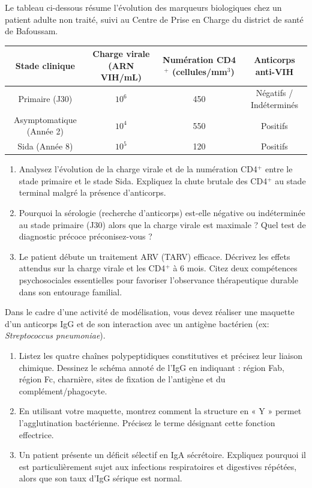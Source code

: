 \documentclass[11pt]{article}
\begin{document}
\begin{exercice}
Le tableau ci-dessous résume l'évolution des marqueurs biologiques chez un patient adulte non traité, suivi au Centre de Prise en Charge du district de santé de Bafoussam.

\begin{center}
\begin{tabular}{|c|c|c|c|}
\hline
\textbf{Stade clinique} & \textbf{Charge virale (ARN VIH/mL)} & \textbf{Numération CD4$^+$ (cellules/mm$^3$)} & \textbf{Anticorps anti-VIH} \\
\hline
Primaire (J30) & $10^6$ & 450 & Négatifs / Indéterminés \\
Asymptomatique (Année 2) & $10^4$ & 550 & Positifs \\
Sida (Année 8) & $10^5$ & 120 & Positifs \\
\hline
\end{tabular}
\end{center}

\begin{enumerate}
    \item Analysez l'évolution de la charge virale et de la numération CD4$^+$ entre le stade primaire et le stade Sida. Expliquez la chute brutale des CD4$^+$ au stade terminal malgré la présence d'anticorps.
    \item Pourquoi la sérologie (recherche d'anticorps) est-elle négative ou indéterminée au stade primaire (J30) alors que la charge virale est maximale ? Quel test de diagnostic précoce préconisez-vous ?
    \item Le patient débute un traitement ARV (TARV) efficace. Décrivez les effets attendus sur la charge virale et les CD4$^+$ à 6 mois. Citez deux compétences psychosociales essentielles pour favoriser l'observance thérapeutique durable dans son entourage familial.
\end{enumerate}
\end{exercice}

\begin{exercice}
Dans le cadre d'une activité de modélisation, vous devez réaliser une maquette d'un anticorps IgG et de son interaction avec un antigène bactérien (ex: \textit{Streptococcus pneumoniae}).
\begin{enumerate}
    \item Listez les quatre chaînes polypeptidiques constitutives et précisez leur liaison chimique. Dessinez le schéma annoté de l'IgG en indiquant : région Fab, région Fc, charnière, sites de fixation de l'antigène et du complément/phagocyte.
    \item En utilisant votre maquette, montrez comment la structure en « Y » permet l'agglutination bactérienne. Précisez le terme désignant cette fonction effectrice.
    \item Un patient présente un déficit sélectif en IgA sécrétoire. Expliquez pourquoi il est particulièrement sujet aux infections respiratoires et digestives répétées, alors que son taux d'IgG sérique est normal.
\end{enumerate}
\end{exercice}
\end{document}
